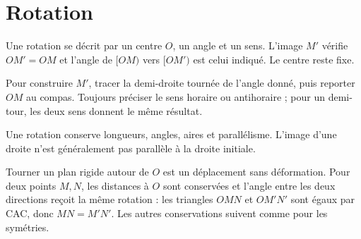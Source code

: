 \documentclass[../cours_3e.tex]{subfiles}
\begin{document}
\section{Rotation}
\begin{definition}
Une rotation se décrit par un centre $O$, un angle et un sens. L'image $M'$ vérifie $OM'=OM$ et l'angle de $[OM)$ vers $[OM')$ est celui indiqué. Le centre reste fixe.
\end{definition}
Pour construire $M'$, tracer la demi-droite tournée de l'angle donné, puis reporter $OM$ au compas. Toujours préciser le sens horaire ou antihoraire ; pour un demi-tour, les deux sens donnent le même résultat.
\begin{center}
\end{center}
\begin{propriete}
Une rotation conserve longueurs, angles, aires et parallélisme. L'image d'une droite n'est généralement pas parallèle à la droite initiale.
\end{propriete}
\begin{justification}
Tourner un plan rigide autour de $O$ est un déplacement sans déformation. Pour deux points $M,N$, les distances à $O$ sont conservées et l'angle entre les deux directions reçoit la même rotation : les triangles $OMN$ et $OM'N'$ sont égaux par CAC, donc $MN=M'N'$. Les autres conservations suivent comme pour les symétries.
\end{justification}
\end{document}
